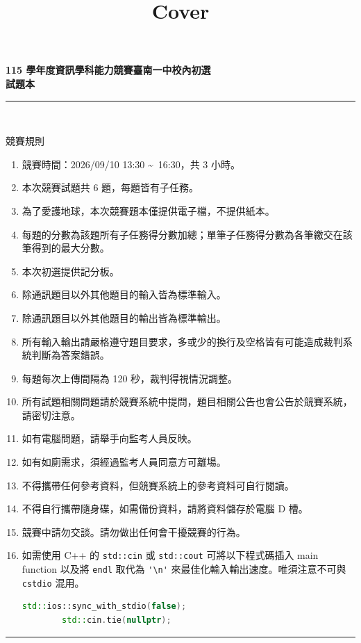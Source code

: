 \documentclass[a4paper]{article}
\title{Cover}
\begin{document}
\begin{center}
\textbf{\huge 115 學年度資訊學科能力競賽臺南一中校內初選\\試題本}\\
\vspace{10mm}
\rule{17cm}{2pt}\\
\vspace{3mm}

\huge 競賽規則\\
\end{center}

\fontsize{14pt}{20pt}\selectfont
\begin{enumerate}
    \setlength\itemsep{0.4pt}
    \item 競賽時間：2026/09/10 13:30 \textasciitilde \, 16:30，共 3 小時。
    \item 本次競賽試題共 6 題，每題皆有子任務。
    \item 為了愛護地球，本次競賽題本僅提供電子檔，不提供紙本。
    \item 每題的分數為該題所有子任務得分數加總；單筆子任務得分數為各筆繳交在該筆得到的最大分數。
    \item 本次初選提供記分板。
    \item 除通訊題目以外其他題目的輸入皆為標準輸入。
    \item 除通訊題目以外其他題目的輸出皆為標準輸出。
    \item 所有輸入輸出請嚴格遵守題目要求，多或少的換行及空格皆有可能造成裁判系統判斷為答案錯誤。
    \item 每題每次上傳間隔為 120 秒，裁判得視情況調整。
    \item 所有試題相關問題請於競賽系統中提問，題目相關公告也會公告於競賽系統，請密切注意。
    \item 如有電腦問題，請舉手向監考人員反映。
    \item 如有如廁需求，須經過監考人員同意方可離場。
    \item 不得攜帶任何參考資料，但競賽系統上的參考資料可自行閱讀。
    \item 不得自行攜帶隨身碟，如需備份資料，請將資料儲存於電腦 D 槽。
    \item 競賽中請勿交談。請勿做出任何會干擾競賽的行為。
    \item 如需使用 C++ 的 \lstinline{std::cin} 或 \lstinline{std::cout} 可將以下程式碼插入 main function 以及將 \lstinline{endl} 取代為 \lstinline{'\n'} 來最佳化輸入輸出速度。唯須注意不可與 \lstinline{cstdio} 混用。
        \begin{lstlisting}[language=C++]
        std::ios::sync_with_stdio(false);
        std::cin.tie(nullptr);
        \end{lstlisting}

\end{enumerate}

\begin{center}
\rule{17cm}{2pt}\\
\end{center}
\end{document}
